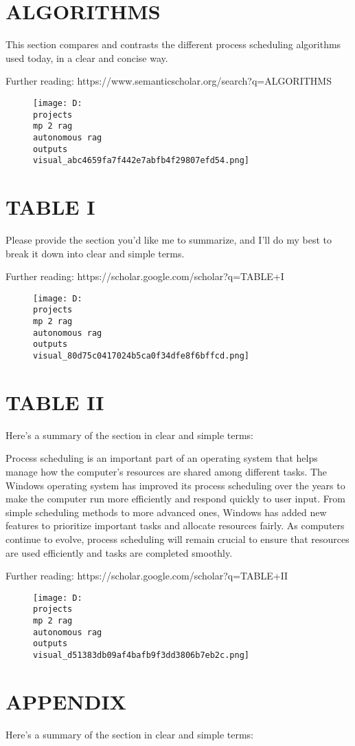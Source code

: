 \documentclass[12pt,a4paper]{article}
\begin{document}
\section{ALGORITHMS}
This section compares and contrasts the different process scheduling algorithms used today, in a clear and concise way.

Further reading: https://www.semanticscholar.org/search?q=ALGORITHMS
\begin{figure}[h]
\centering
\texttt{[image: D:\\projects\\mp 2 rag\\autonomous rag\\outputs\\visual\_abc4659fa7f442e7abfb4f29807efd54.png]}
\end{figure}
\section{TABLE I}
Please provide the section you'd like me to summarize, and I'll do my best to break it down into clear and simple terms.

Further reading: https://scholar.google.com/scholar?q=TABLE+I
\begin{figure}[h]
\centering
\texttt{[image: D:\\projects\\mp 2 rag\\autonomous rag\\outputs\\visual\_80d75c0417024b5ca0f34dfe8f6bffcd.png]}
\end{figure}
\section{TABLE II}
Here's a summary of the section in clear and simple terms:

Process scheduling is an important part of an operating system that helps manage how the computer's resources are shared among different tasks. The Windows operating system has improved its process scheduling over the years to make the computer run more efficiently and respond quickly to user input. From simple scheduling methods to more advanced ones, Windows has added new features to prioritize important tasks and allocate resources fairly. As computers continue to evolve, process scheduling will remain crucial to ensure that resources are used efficiently and tasks are completed smoothly.

Further reading: https://scholar.google.com/scholar?q=TABLE+II
\begin{figure}[h]
\centering
\texttt{[image: D:\\projects\\mp 2 rag\\autonomous rag\\outputs\\visual\_d51383db09af4bafb9f3dd3806b7eb2c.png]}
\end{figure}
\section{APPENDIX}
Here's a summary of the section in clear and simple terms:
\end{document}
